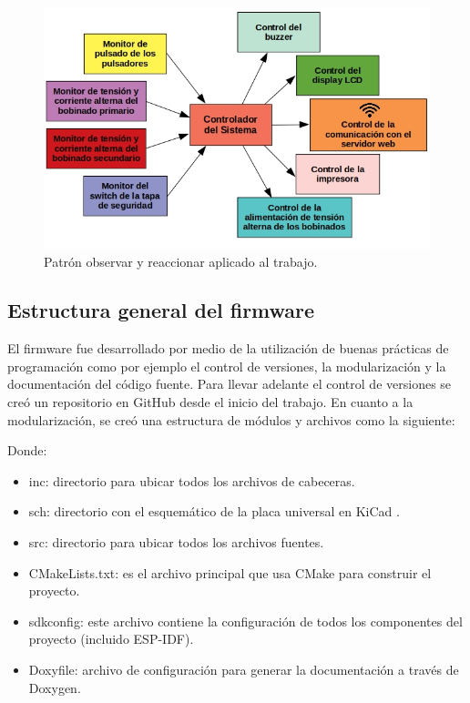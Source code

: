 \begin{figure}[htpb]
	\centering
	\includegraphics[scale=0.55]{./Figures/arquitecturaSoft.jpg}
	\caption{Patrón observar y reaccionar aplicado al trabajo.}
	\label{fig:patronAplicado}
\end{figure}



\subsection{Estructura general del firmware}

El firmware fue desarrollado por medio de la utilización de buenas prácticas de programación como por ejemplo el control de versiones, la modularización y la documentación del código fuente. Para llevar adelante el control de versiones se creó un repositorio en GitHub \citep{TP_CESE} desde el inicio del trabajo. En cuanto a la modularización, se creó una estructura de módulos y archivos como la siguiente:


Donde: 
\begin{itemize}
\item inc: directorio para ubicar todos los archivos de cabeceras.
\item sch: directorio con el esquemático de la placa universal en KiCad \citep{KICAD}.
\item src: directorio para ubicar todos los archivos fuentes.
\item CMakeLists.txt: es el archivo principal que usa CMake para construir el proyecto.
\item sdkconfig: este archivo contiene la configuración de todos los componentes del proyecto (incluido ESP-IDF).
\item Doxyfile: archivo de configuración para generar la documentación a través de Doxygen.
\end{itemize}

